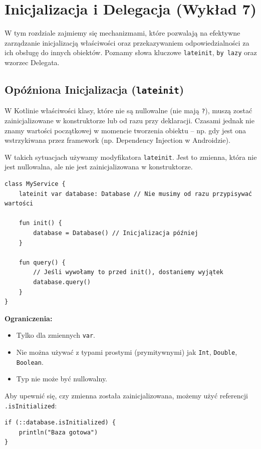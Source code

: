 \chapter{Inicjalizacja i Delegacja (Wykład 7)}

W tym rozdziale zajmiemy się mechanizmami, które pozwalają na efektywne zarządzanie inicjalizacją właściwości oraz przekazywaniem odpowiedzialności za ich obsługę do innych obiektów. Poznamy słowa kluczowe \texttt{lateinit}, \texttt{by lazy} oraz wzorzec Delegata.

\section{Opóźniona Inicjalizacja (\texttt{lateinit})}

W Kotlinie właściwości klasy, które nie są nullowalne (nie mają \texttt{?}), muszą zostać zainicjalizowane w konstruktorze lub od razu przy deklaracji. Czasami jednak nie znamy wartości początkowej w momencie tworzenia obiektu – np. gdy jest ona wstrzykiwana przez framework (np. Dependency Injection w Androidzie).

W takich sytuacjach używamy modyfikatora \texttt{lateinit}. Jest to zmienna, która nie jest nullowalna, ale nie jest zainicjalizowana w konstruktorze.

\begin{verbatim}
class MyService {
    lateinit var database: Database // Nie musimy od razu przypisywać wartości
    
    fun init() {
        database = Database() // Inicjalizacja później
    }
    
    fun query() {
        // Jeśli wywołamy to przed init(), dostaniemy wyjątek
        database.query() 
    }
}
\end{verbatim}

\textbf{Ograniczenia:}
\begin{itemize}
    \item Tylko dla zmiennych \texttt{var}.
    \item Nie można używać z typami prostymi (prymitywnymi) jak \texttt{Int}, \texttt{Double}, \texttt{Boolean}.
    \item Typ nie może być nullowalny.
\end{itemize}

Aby upewnić się, czy zmienna została zainicjalizowana, możemy użyć referencji \texttt{.isInitialized}:
\begin{verbatim}
if (::database.isInitialized) {
    println("Baza gotowa")
}
\end{verbatim}

